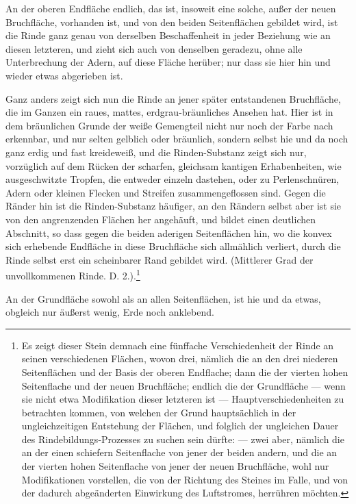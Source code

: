 \documentclass[a4paper, 11pt, oneside, german]{article}
\begin{document}
An der oberen Endfläche endlich, das ist, insoweit eine solche, außer der neuen Bruchfläche, vorhanden ist, und von den beiden Seitenflächen gebildet wird, ist die Rinde ganz genau von derselben Beschaffenheit in jeder Beziehung wie an diesen letzteren, und zieht sich auch von denselben geradezu, ohne alle Unterbrechung der Adern, auf diese Fläche herüber; nur dass sie hier hin und wieder etwas abgerieben ist.

Ganz anders zeigt sich nun die Rinde an jener später entstandenen Bruchfläche, die im Ganzen ein raues, mattes, erdgrau-bräunliches Ansehen hat. Hier ist in dem bräunlichen Grunde der weiße Gemengteil nicht nur noch der Farbe nach erkennbar, und nur selten gelblich oder bräunlich, sondern selbst hie und da noch ganz erdig und fast kreideweiß, und die Rinden-Substanz zeigt sich nur, vorzüglich auf dem Rücken der scharfen, gleichsam kantigen Erhabenheiten, wie ausgeschwitzte Tropfen, die entweder einzeln dastehen, oder zu Perlenschnüren, Adern oder kleinen Flecken und Streifen zusammengeflossen sind. Gegen die Ränder hin ist die Rinden-Substanz häufiger, an den Rändern selbst aber ist sie von den angrenzenden Flächen her angehäuft, und bildet einen deutlichen Abschnitt, so dass gegen die beiden aderigen Seitenflächen hin, wo die konvex sich erhebende Endfläche in diese Bruchfläche sich allmählich verliert, durch die Rinde selbst erst ein scheinbarer Rand gebildet wird. (Mittlerer Grad der unvollkommenen Rinde. D. 2.).\footnote{Es zeigt dieser Stein demnach eine fünffache Verschiedenheit der Rinde an seinen verschiedenen Flächen, wovon drei, nämlich die an den drei niederen Seitenflächen und der Basis der oberen Endflache; dann die der vierten hohen Seitenflache und der neuen Bruchfläche; endlich die der Grundfläche --- wenn sie nicht etwa Modifikation dieser letzteren ist --- Hauptverschiedenheiten zu betrachten kommen, von welchen der Grund hauptsächlich in der ungleichzeitigen Entstehung der Flächen, und folglich der ungleichen Dauer des Rindebildungs-Prozesses zu suchen sein dürfte: --- zwei aber, nämlich die an der einen schiefern Seitenflache von jener der beiden andern, und die an der vierten hohen Seitenflache von jener der neuen Bruchfläche, wohl nur Modifikationen vorstellen, die von der Richtung des Steines im Falle, und von der dadurch abgeänderten Einwirkung des Luftstromes, herrühren möchten.} 

An der Grundfläche sowohl als an allen Seitenflächen, ist hie und da etwas, obgleich nur äußerst wenig, Erde noch anklebend.
\end{document}
